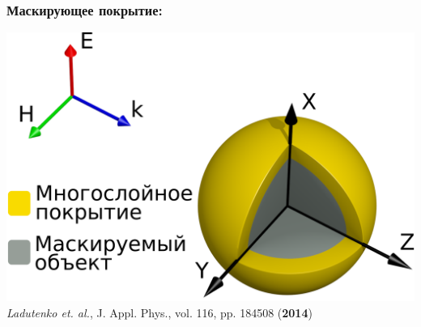 \documentclass[14pt]{beamer}
\begin{document}
\begin{frame}
  \frametitle{Маскирующее покрытие:}
  \begin{center}
    \includegraphics[width=0.8\linewidth]{model-view}    \\
    \vspace{1em}
   \small \textit{Ladutenko et. al.},
   {J. Appl. Phys.}, vol. 116, pp. 184508  (\textbf{2014})
\end{center}
\end{frame}
\end{document}
